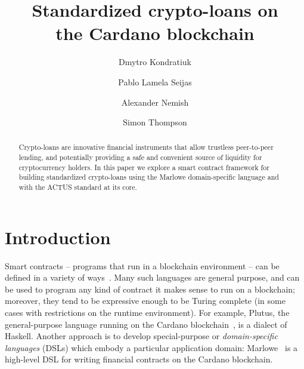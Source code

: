 \documentclass[runningheads]{llncs}
\begin{document}
\title{Standardized crypto-loans on\\ the Cardano blockchain}%


\author{Dmytro Kondratiuk \and
				Pablo {Lamela Seijas} \and
				Alexander Nemish \and
                Simon Thompson}





%
\maketitle              %
%
\begin{abstract}
Crypto-loans are %
innovative financial instruments that
allow trustless peer-to-peer %
lending, and potentially providing a safe and convenient
source of liquidity for cryptocurrency holders. In this paper we
explore a smart contract framework for building standardized crypto-loans
using the Marlowe domain-specific language and with the ACTUS standard at its core.

\end{abstract}


\section{Introduction}



Smart contracts -- programs that run in a blockchain environment --  can be defined in a variety of ways~\cite{cryptoeprint:2016:1156}. Many such languages are general purpose, and can be used to program any kind of contract it makes sense to run on a blockchain; moreover, they tend to be expressive enough to be Turing complete (in some cases with restrictions on the runtime environment). For example, Plutus, the general-purpose language running on the Cardano blockchain~\cite{utxo-vs-accounts}, is a dialect of Haskell. Another approach is to develop special-purpose or \emph{domain-specific languages} (DSLs) which embody a particular application domain: Marlowe~\cite{marlowe} is a high-level DSL for writing
financial contracts on the Cardano blockchain. 
\end{document}
